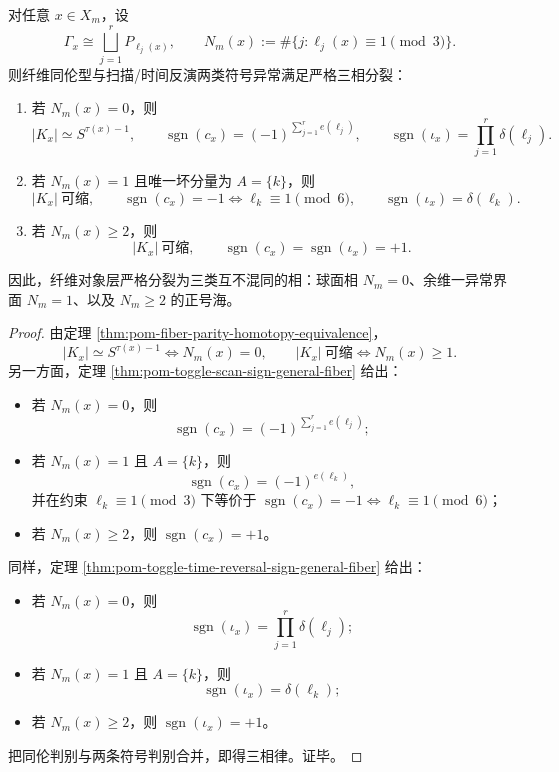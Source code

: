 \begin{theorem}\label{thm:conclusion-pisano1-threephase-sign-sea-law}
对任意 \(x\in X_m\)，设
\[
\Gamma_x\cong \bigsqcup_{j=1}^{r}P_{\ell_j(x)},
\qquad
N_m(x):=\#\{j:\ell_j(x)\equiv 1\pmod 3\}.
\]
则纤维同伦型与扫描/时间反演两类符号异常满足严格三相分裂：
\begin{enumerate}
  \item 若 \(N_m(x)=0\)，则
  \[
  |K_x|\simeq S^{\tau(x)-1},
  \qquad
  \operatorname{sgn}(c_x)=(-1)^{\sum_{j=1}^{r}e(\ell_j)},
  \qquad
  \operatorname{sgn}(\iota_x)=\prod_{j=1}^{r}\delta(\ell_j).
  \]
  \item 若 \(N_m(x)=1\) 且唯一坏分量为 \(A=\{k\}\)，则
  \[
  |K_x|\ \text{可缩},
  \qquad
  \operatorname{sgn}(c_x)=-1 \iff \ell_k\equiv 1\pmod 6,
  \qquad
  \operatorname{sgn}(\iota_x)=\delta(\ell_k).
  \]
  \item 若 \(N_m(x)\ge 2\)，则
  \[
  |K_x|\ \text{可缩},
  \qquad
  \operatorname{sgn}(c_x)=\operatorname{sgn}(\iota_x)=+1.
  \]
\end{enumerate}
因此，纤维对象层严格分裂为三类互不混同的相：球面相 \(N_m=0\)、余维一异常界面 \(N_m=1\)、以及 \(N_m\ge 2\) 的正号海。
\end{theorem}

\begin{proof}
由定理 \ref{thm:pom-fiber-parity-homotopy-equivalence}，
\[
|K_x|\simeq S^{\tau(x)-1}
\iff
N_m(x)=0,
\qquad
|K_x|\ \text{可缩}
\iff
N_m(x)\ge 1.
\]
另一方面，定理 \ref{thm:pom-toggle-scan-sign-general-fiber} 给出：
\begin{itemize}
  \item 若 \(N_m(x)=0\)，则
  \[
  \operatorname{sgn}(c_x)=(-1)^{\sum_{j=1}^{r}e(\ell_j)};
  \]
  \item 若 \(N_m(x)=1\) 且 \(A=\{k\}\)，则
  \[
  \operatorname{sgn}(c_x)=(-1)^{e(\ell_k)},
  \]
  并在约束 \(\ell_k\equiv 1\pmod 3\) 下等价于
  \(
  \operatorname{sgn}(c_x)=-1 \iff \ell_k\equiv 1\pmod 6
  \)；
  \item 若 \(N_m(x)\ge 2\)，则 \(\operatorname{sgn}(c_x)=+1\)。
\end{itemize}
同样，定理 \ref{thm:pom-toggle-time-reversal-sign-general-fiber} 给出：
\begin{itemize}
  \item 若 \(N_m(x)=0\)，则
  \[
  \operatorname{sgn}(\iota_x)=\prod_{j=1}^{r}\delta(\ell_j);
  \]
  \item 若 \(N_m(x)=1\) 且 \(A=\{k\}\)，则
  \[
  \operatorname{sgn}(\iota_x)=\delta(\ell_k);
  \]
  \item 若 \(N_m(x)\ge 2\)，则 \(\operatorname{sgn}(\iota_x)=+1\)。
\end{itemize}
把同伦判别与两条符号判别合并，即得三相律。证毕。
\end{proof}

